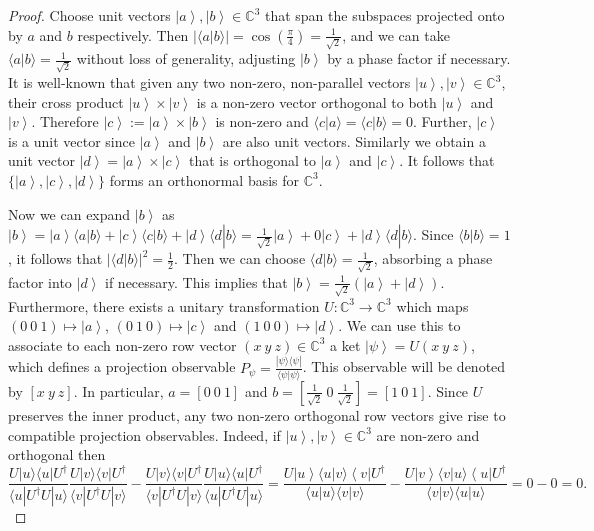 \documentclass[11pt, a4paper]{article}
\theoremstyle{definition}
\newcommand{\bra}[1]{\left< #1 \right|}
\newcommand{\ket}[1]{\left| #1 \right>}
\newcommand{\iprod}[2]{\langle #1 | #2 \rangle}
\newcommand{\mprod}[3]{\langle #1 | #2 | #3 \rangle}
\newcommand{\oprod}[2]{| #1 \rangle\langle #2 |}
\begin{document}
\begin{proof}
	Choose unit vectors $\ket{a}, \ket{b} \in \mathbb{C}^3$ that span the subspaces projected onto by $a$ and $b$ respectively.
	Then $|\iprod{a}{b}| = \cos(\frac{\pi}{4}) = \frac{1}{\sqrt{2}}$, and we can take $\iprod{a}{b} = \frac{1}{\sqrt{2}}$ without loss of generality, adjusting $\ket{b}$ by a phase factor if necessary.
	It is well-known that given any two non-zero, non-parallel vectors $\ket{u}, \ket{v} \in \mathbb{C}^3$, their cross product $\ket{u} \times \ket{v}$ is a non-zero vector orthogonal to both $\ket{u}$ and $\ket{v}$.
	Therefore $\ket{c} := \ket{a} \times \ket{b}$ is non-zero and $\iprod{c}{a} = \iprod{c}{b} = 0$.
	Further, $\ket{c}$ is a unit vector since $\ket{a}$ and $\ket{b}$ are also unit vectors.
	Similarly we obtain a unit vector $\ket{d} = \ket{a} \times \ket{c}$ that is orthogonal to $\ket{a}$ and $\ket{c}$.
	It follows that $\{ \ket{a}, \ket{c}, \ket{d} \}$ forms an orthonormal basis for $\mathbb{C}^3$.
	
	Now we can expand $\ket{b}$ as $\ket{b} = \ket{a} \iprod{a}{b} + \ket{c} \iprod{c}{b} + \ket{d} \iprod{d}{b} = \frac{1}{\sqrt{2}} \ket{a} + 0 \ket{c} + \ket{d} \iprod{d}{b}$.
	Since $\iprod{b}{b} = 1$, it follows that $|\iprod{d}{b}|^2 = \frac{1}{2}$.
	Then we can choose $\iprod{d}{b} = \frac{1}{\sqrt{2}}$, absorbing a phase factor into $\ket{d}$ if necessary.
	This implies that $\ket{b} = \frac{1}{\sqrt{2}} (\ket{a} + \ket{d})$.
	Furthermore, there exists a unitary transformation $U : \mathbb{C}^3 \to \mathbb{C}^3$ which maps $(0~0~1) \mapsto \ket{a}$, $(0~1~0) \mapsto \ket{c}$ and $(1~0~0) \mapsto \ket{d}$.
	We can use this to associate to each non-zero row vector $(x~y~z) \in \mathbb{C}^3$ a ket $\ket{\psi} = U (x~y~z)$, which defines a projection observable $P_\psi = \frac{\oprod{\psi}{\psi}}{\iprod{\psi}{\psi}}$.
	This observable will be denoted by $[x~y~z]$.
	In particular, $a = [0~0~1]$ and $b = [\frac{1}{\sqrt{2}}~0~\frac{1}{\sqrt{2}}] = [1~0~1]$.
	Since $U$ preserves the inner product, any two non-zero orthogonal row vectors give rise to compatible projection observables.
	Indeed, if $\ket{u}, \ket{v} \in \mathbb{C}^3$ are non-zero and orthogonal then $$\frac{U \oprod{u}{u} U^\dagger}{\mprod{u}{U^\dagger U}{u}} \frac{U \oprod{v}{v} U^\dagger}{\mprod{v}{U^\dagger U}{v}} - \frac{U \oprod{v}{v} U^\dagger}{\mprod{v}{U^\dagger U}{v}} \frac{U \oprod{u}{u} U^\dagger}{\mprod{u}{U^\dagger U}{u}} = \frac{U \ket{u} \iprod{u}{v} \bra{v} U^\dagger}{\iprod{u}{u} \iprod{v}{v}} - \frac{U \ket{v} \iprod{v}{u} \bra{u} U^\dagger}{\iprod{v}{v} \iprod{u}{u}} = 0 - 0 = 0.$$
	

\end{proof}
\end{document}
